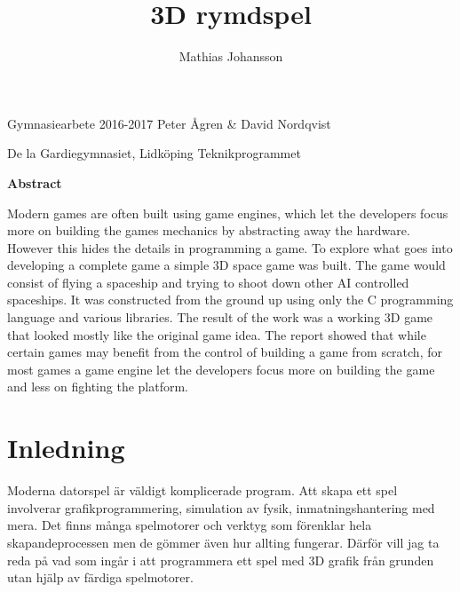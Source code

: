 \documentclass[12pt, a4paper]{article}
\title{3D rymdspel}
\author{Mathias Johansson}
\begin{document}
	\maketitle
	
	\vfill
	
	\begin{center}
		{Gymnasiearbete 2016-2017 \hfill Peter Ågren \& David Nordqvist}
	\end{center}
	
	\begin{center}
		{De la Gardiegymnasiet, Lidköping \hfill Teknikprogrammet}
	\end{center}
	
	\newpage
	
	\begin{center}
		\Large\textbf{Abstract}
	\end{center}
	
	Modern games are often built using game engines, which let the developers focus more on building the games mechanics by abstracting away the hardware. However this hides the details in programming a game. To explore what goes into developing a complete game a simple 3D space game was built. The game would consist of flying a spaceship and trying to shoot down other AI controlled spaceships. It was constructed from the ground up using only the C programming language and various libraries. The result of the work was a working 3D game that looked mostly like the original game idea. The report showed that while certain games may benefit from the control of building a game from scratch, for most games a game engine let the developers focus more on building the game and less on fighting the platform. 
	
	\newpage
	
	\tableofcontents
	
	\newpage
	
	\section{Inledning}

	Moderna datorspel är väldigt komplicerade program. Att skapa ett spel involverar grafikprogrammering, simulation av fysik, inmatningshantering med mera. Det finns många spelmotorer och verktyg som förenklar hela skapandeprocessen men de gömmer även hur allting fungerar. Därför vill jag ta reda på vad som ingår i att programmera ett spel med 3D grafik från grunden utan hjälp av färdiga spelmotorer. 
	
\end{document}
